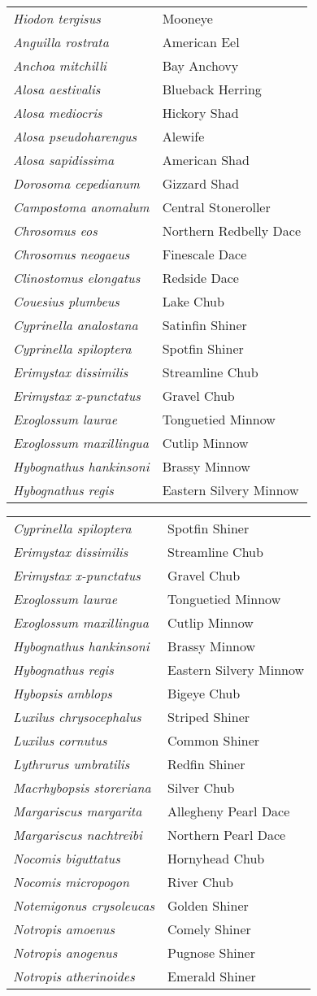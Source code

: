 \documentclass[11pt]{article}
\begin{document}
\begin{tabular}{@{}L{3in}L{3in}@{}}
\textit{Hiodon tergisus} & Mooneye\tabularnewline
\textit{Anguilla rostrata} & American Eel\tabularnewline
\textit{Anchoa mitchilli} & Bay Anchovy\tabularnewline
\textit{Alosa aestivalis} & Blueback Herring\tabularnewline
\textit{Alosa mediocris} & Hickory Shad\tabularnewline
\textit{Alosa pseudoharengus} & Alewife\tabularnewline
\textit{Alosa sapidissima} & American Shad\tabularnewline
\textit{Dorosoma cepedianum} & Gizzard Shad\tabularnewline
\textit{Campostoma anomalum} & Central Stoneroller\tabularnewline
\textit{Chrosomus eos} & Northern Redbelly Dace\tabularnewline
\textit{Chrosomus neogaeus} & Finescale Dace\tabularnewline
\textit{Clinostomus elongatus} & Redside Dace\tabularnewline
\textit{Couesius plumbeus} & Lake Chub\tabularnewline
\textit{Cyprinella analostana} & Satinfin Shiner\tabularnewline
\textit{Cyprinella spiloptera} & Spotfin Shiner\tabularnewline
\textit{Erimystax dissimilis} & Streamline Chub\tabularnewline
\textit{Erimystax x-punctatus} & Gravel Chub\tabularnewline
\textit{Exoglossum laurae} & Tonguetied Minnow\tabularnewline
\textit{Exoglossum maxillingua} & Cutlip Minnow\tabularnewline
\textit{Hybognathus hankinsoni} & Brassy Minnow\tabularnewline
\textit{Hybognathus regis} & Eastern Silvery Minnow\tabularnewline
\end{tabular}

\newpage

\vspace{\baselineskip}

%
\textbf{\Student}

\begin{tabular}{@{}L{3in}L{3in}@{}}
\textit{Cyprinella spiloptera} & Spotfin Shiner\tabularnewline
\textit{Erimystax dissimilis} & Streamline Chub\tabularnewline
\textit{Erimystax x-punctatus} & Gravel Chub\tabularnewline
\textit{Exoglossum laurae} & Tonguetied Minnow\tabularnewline
\textit{Exoglossum maxillingua} & Cutlip Minnow\tabularnewline
\textit{Hybognathus hankinsoni} & Brassy Minnow\tabularnewline
\textit{Hybognathus regis} & Eastern Silvery Minnow\tabularnewline
\textit{Hybopsis amblops} & Bigeye Chub\tabularnewline
\textit{Luxilus chrysocephalus} & Striped Shiner\tabularnewline
\textit{Luxilus cornutus} & Common Shiner\tabularnewline
\textit{Lythrurus umbratilis} & Redfin Shiner\tabularnewline
\textit{Macrhybopsis storeriana} & Silver Chub\tabularnewline
\textit{Margariscus margarita} & Allegheny Pearl Dace\tabularnewline
\textit{Margariscus nachtreibi} & Northern Pearl Dace\tabularnewline
\textit{Nocomis biguttatus} & Hornyhead Chub\tabularnewline
\textit{Nocomis micropogon} & River Chub\tabularnewline
\textit{Notemigonus crysoleucas} & Golden Shiner\tabularnewline
\textit{Notropis amoenus} & Comely Shiner\tabularnewline
\textit{Notropis anogenus} & Pugnose Shiner\tabularnewline
\textit{Notropis atherinoides} & Emerald Shiner\tabularnewline
\end{tabular}
\end{document}
